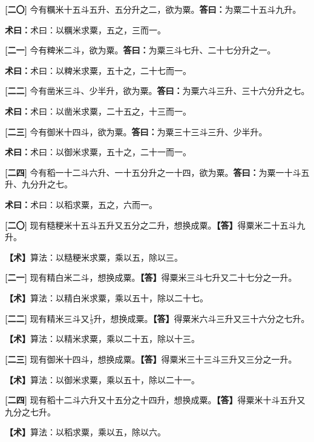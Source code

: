 \documentclass[10pt,a4paper]{article}
\newlength{\lw}
\newlength{\rw}
\newcommand{\bilingc}[2]{%
  \par\vspace{0.1em}%
  \noindent\begin{minipage}[t]{\lw}
  {\small #1}
  \end{minipage}%
  \hfill%
  \begin{minipage}[t]{\rw}
  {\small #2}
  \end{minipage}%
  \vspace{0.1em}%
}
\newcommand{\da}{\textbf{\textcolor{answercolor}{答曰：}}}
\newcommand{\daB}{\textbf{\textcolor{answercolor}{【答】}}}
\newcommand{\shu}{\textbf{\textcolor{methodcolor}{术曰：}}}
\newcommand{\shuB}{\textbf{\textcolor{methodcolor}{【术】}}}
\newcommand{\pn}[1]{\textbf{[#1]}}
\begin{document}
\bilingc{
\pn{二〇} 今有糲米十五斗五升、五分升之二，欲为粟。\quad\da 为粟二十五斗九升。

\shu 术曰：以糲米求粟，五之，三而一。

\pn{二一} 今有粺米二斗，欲为粟。\quad\da 为粟三斗七升、二十七分升之一。

\shu 术曰：以粺米求粟，五十之，二十七而一。

\pn{二二} 今有凿米三斗、少半升，欲为粟。\quad\da 为粟六斗三升、三十六分升之七。

\shu 术曰：以凿米求粟，二十五之，十三而一。

\pn{二三} 今有御米十四斗，欲为粟。\quad\da 为粟三十三斗三升、少半升。

\shu 术曰：以御米求粟，五十之，二十一而一。

\pn{二四} 今有稻一十二斗六升、一十五分升之一十四，欲为粟。\quad\da 为粟一十斗五升、九分升之七。

\shu 术曰：以稻求粟，五之，六而一。
}{
\pn{二〇} 现有糙粳米十五斗五升又五分之二升，想换成粟。\quad\daB 得粟米二十五斗九升。

\shuB 算法：以糙粳米求粟，乘以五，除以三。

\pn{二一} 现有精白米二斗，想换成粟。\quad\daB 得粟米三斗七升又二十七分之一升。

\shuB 算法：以精白米求粟，乘以五十，除以二十七。

\pn{二二} 现有精米三斗又$\frac13$升，想换成粟。\quad\daB 得粟米六斗三升又三十六分之七升。

\shuB 算法：以精米求粟，乘以二十五，除以十三。

\pn{二三} 现有御米十四斗，想换成粟。\quad\daB 得粟米三十三斗三升又三分之一升。

\shuB 算法：以御米求粟，乘以五十，除以二十一。

\pn{二四} 现有稻十二斗六升又十五分之十四升，想换成粟。\quad\daB 得粟米十斗五升又九分之七升。

\shuB 算法：以稻求粟，乘以五，除以六。
}

\vspace{0.3em}
\end{document}
